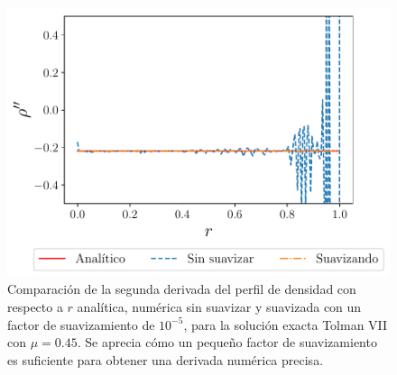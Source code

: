 \begin{figure}[H]
    \centering
    \includegraphics[width=0.7\linewidth]{figures/rhoppTolmanVIImu45.pdf}
    \caption[Comparación entre $\rho^{\prime\prime}$ para una solución exacta y lo obtenido numéricamente]{Comparación de la segunda derivada del perfil de densidad con respecto a $r$ analítica, numérica sin suavizar y suavizada con un factor de suavizamiento de $10^{-5}$, para la solución exacta Tolman VII con $\mu=0.45$. Se aprecia cómo un pequeño factor de suavizamiento es suficiente para obtener una derivada numérica precisa. }
    \label{numericald}
\end{figure}